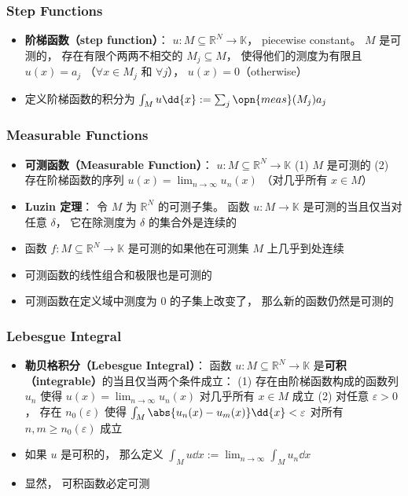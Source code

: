\subsubsection{Step Functions}
\begin{itemize}
\item \textbf{阶梯函数（step function）}： $u:M\subseteq\mathbb R^N \to\mathbb K$， piecewise constant。 $M$ 是可测的， 存在有限个两两不相交的 $M_j \subseteq M$， 使得他们的测度为有限且 $u(x) = a_j$ （$\forall x\in M_j$ 和 $\forall j$）， $u(x) = 0$（otherwise）

\item 定义阶梯函数的积分为 $\int_M u\dd{x} := \sum_j \opn{meas}(M_j)a_j$
\end{itemize}

\subsubsection{Measurable Functions}
\begin{itemize}
\item \textbf{可测函数（Measurable Function）}： $u: M\subseteq\mathbb R^N \to\mathbb K$ (1) $M$ 是可测的 (2) 存在阶梯函数的序列 $u(x) = \lim_{n\to\infty} u_n(x)$ （对几乎所有 $x\in M$）

\item \textbf{Luzin 定理}： 令 $M$ 为 $\mathbb R^N$ 的可测子集。 函数 $u: M\to\mathbb K$ 是可测的当且仅当对任意 $\delta$， 它在除测度为 $\delta$ 的集合外是连续的

\item 函数 $f:M\subseteq\mathbb R^N \to \mathbb K$ 是可测的如果他在可测集 $M$ 上几乎到处连续

\item 可测函数的线性组合和极限也是可测的

\item 可测函数在定义域中测度为 0 的子集上改变了， 那么新的函数仍然是可测的
\end{itemize}

\subsubsection{Lebesgue Integral}
\begin{itemize}
\item \textbf{勒贝格积分（Lebesgue Integral）}： 函数 $u :M\subseteq\mathbb R^N\to\mathbb K$ 是\textbf{可积（integrable）}的当且仅当两个条件成立： (1) 存在由阶梯函数构成的函数列 $u_n$ 使得 $u(x) = \lim_{n\to\infty} u_n(x)$ 对几乎所有 $x\in M$ 成立 (2) 对任意 $\varepsilon> 0$， 存在 $n_0(\varepsilon)$ 使得 $\int_M \abs{u_n(x) - u_m(x)} \dd{x} < \varepsilon$ 对所有 $n, m\ge n_0(\varepsilon)$ 成立

\item 如果 $u$ 是可积的， 那么定义 $\int_M u\dd{x} := \lim_{n\to\infty} \int_{M} u_n \dd{x}$

\item 显然， 可积函数必定可测
\end{itemize}
